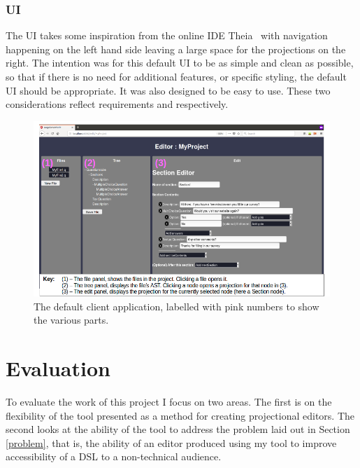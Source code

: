\documentclass{article}
\begin{document}
{\subsubsection{UI}
The UI takes some inspiration from the online IDE Theia~\cite{theia} with navigation happening on the left hand side leaving a large space for the projections on the right. The intention was for this default UI to be as simple and clean as possible, so that if there is no need for additional features, or specific styling, the default UI should be appropriate. It was also designed to be easy to use. These two considerations reflect requirements \RSetup and \RIntuitive respectively.
\begin{figure}[h!]
  \centering
  \includegraphics[width=\linewidth]{./Screenshots/labelledUI.png}
  \caption{The default client application, labelled with pink numbers to show the various parts.}
  \label{fig:webUI}
\end{figure}
%
%
\section{Evaluation}\label{evaluation}
To evaluate the work of this project I focus on two areas. The first is on the flexibility of the tool presented as a method for creating projectional editors. The second looks at the ability of the tool to address the problem laid out in Section \ref{problem}, that is, the ability of an editor produced using my tool to improve accessibility of a DSL to a non-technical audience.
}
\end{document}
